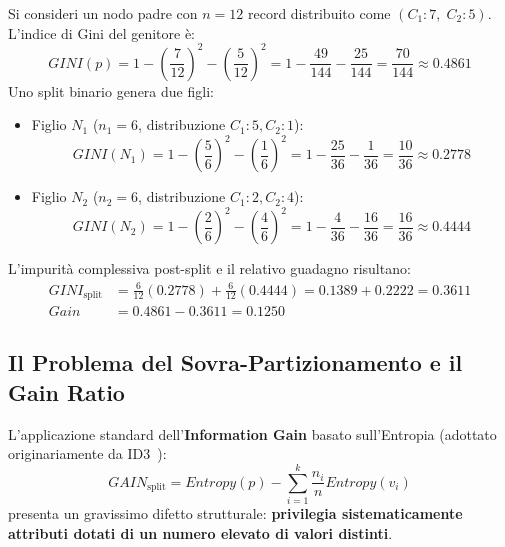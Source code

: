 \begin{example}
Si consideri un nodo padre con $n = 12$ record distribuito come $(C_1: 7, \; C_2: 5)$. L'indice di Gini del genitore è:
\begin{equation}
    GINI(p) = 1 - \left(\frac{7}{12}\right)^2 - \left(\frac{5}{12}\right)^2 = 1 - \frac{49}{144} - \frac{25}{144} = \frac{70}{144} \approx 0.4861
\end{equation}
Uno split binario genera due figli:
\begin{itemize}
    \item Figlio $N_1$ ($n_1 = 6$, distribuzione $C_1: 5, C_2: 1$):
    \begin{equation}
        GINI(N_1) = 1 - \left(\frac{5}{6}\right)^2 - \left(\frac{1}{6}\right)^2 = 1 - \frac{25}{36} - \frac{1}{36} = \frac{10}{36} \approx 0.2778
    \end{equation}
    \item Figlio $N_2$ ($n_2 = 6$, distribuzione $C_1: 2, C_2: 4$):
    \begin{equation}
        GINI(N_2) = 1 - \left(\frac{2}{6}\right)^2 - \left(\frac{4}{6}\right)^2 = 1 - \frac{4}{36} - \frac{16}{36} = \frac{16}{36} \approx 0.4444
    \end{equation}
\end{itemize}
L'impurità complessiva post-split e il relativo guadagno risultano:
\begin{align}
    GINI_{\text{split}} &= \frac{6}{12}(0.2778) + \frac{6}{12}(0.4444) = 0.1389 + 0.2222 = 0.3611 \\
    Gain &= 0.4861 - 0.3611 = 0.1250
\end{align}
\end{example}

\FloatBarrier
\subsection{Il Problema del Sovra-Partizionamento e il Gain Ratio}
\label{subsec:dm-gain-ratio}

L'applicazione standard dell'\textbf{Information Gain} basato sull'Entropia (adottato originariamente da ID3~\cite{quinlan1986}):
\begin{equation}
    GAIN_{\text{split}} = Entropy(p) - \sum_{i=1}^k \frac{n_i}{n} Entropy(v_i)
\end{equation}
presenta un gravissimo difetto strutturale: \textbf{privilegia sistematicamente attributi dotati di un numero elevato di valori distinti}.

